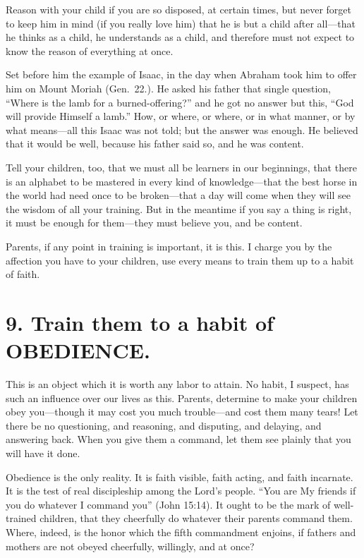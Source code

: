 \documentclass[
]{book}
\begin{document}
Reason with your child if you are so disposed, at certain times, but never forget to keep him in mind (if you really love him) that he is but a child after all---that he thinks as a child, he understands as a child, and therefore must not expect to know the reason of everything at once.

Set before him the example of Isaac, in the day when Abraham took him to offer him on Mount Moriah (Gen.~22.). He asked his father that single question, ``Where is the lamb for a burned-offering?'' and he got no answer but this, ``God will provide Himself a lamb.'' How, or where, or where, or in what manner, or by what means---all this Isaac was not told; but the answer was enough. He believed that it would be well, because his father said so, and he was content.

Tell your children, too, that we must all be learners in our beginnings, that there is an alphabet to be mastered in every kind of knowledge---that the best horse in the world had need once to be broken---that a day will come when they will see the wisdom of all your training. But in the meantime if you say a thing is right, it must be enough for them---they must believe you, and be content.

Parents, if any point in training is important, it is this. I charge you by the affection you have to your children, use every means to train them up to a habit of faith.

\hypertarget{train-them-to-a-habit-of-obedience.}{%
\section*{9. Train them to a habit of OBEDIENCE.}\label{train-them-to-a-habit-of-obedience.}}

This is an object which it is worth any labor to attain. No habit, I suspect, has such an influence over our lives as this. Parents, determine to make your children obey you---though it may cost you much trouble---and cost them many tears! Let there be no questioning, and reasoning, and disputing, and delaying, and answering back. When you give them a command, let them see plainly that you will have it done.

Obedience is the only reality. It is faith visible, faith acting, and faith incarnate. It is the test of real discipleship among the Lord's people. ``You are My friends if you do whatever I command you'' (John 15:14). It ought to be the mark of well-trained children, that they cheerfully do whatever their parents command them. Where, indeed, is the honor which the fifth commandment enjoins, if fathers and mothers are not obeyed cheerfully, willingly, and at once?
\end{document}
